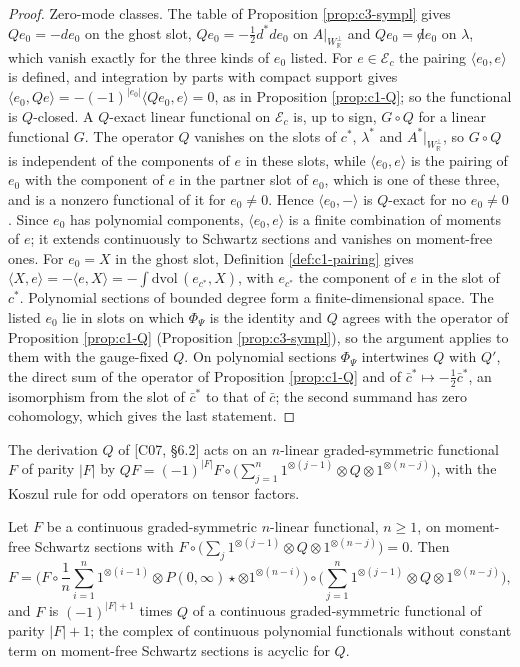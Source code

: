 \begin{proof}
Zero-mode classes. The table of Proposition \ref{prop:c3-sympl} gives $Qe_0=-de_0$ on the ghost slot, $Qe_0=-\tfrac12d^*de_0$ on $A|_{W_{\mathbb R}^\perp}$ and $Qe_0={\not d}e_0$ on $\lambda$, which vanish exactly for the three kinds of $e_0$ listed. For $e\in\mathscr E_c$ the pairing $\langle e_0,e\rangle$ is defined, and integration by parts with compact support gives $\langle e_0,Qe\rangle=-(-1)^{|e_0|}\langle Qe_0,e\rangle=0$, as in Proposition \ref{prop:c1-Q}; so the functional is $Q$-closed. A $Q$-exact linear functional on $\mathscr E_c$ is, up to sign, $G\circ Q$ for a linear functional $G$. The operator $Q$ vanishes on the slots of $c^*$, $\lambda^*$ and $A^*|_{W_{\mathbb R}^\perp}$, so $G\circ Q$ is independent of the components of $e$ in these slots, while $\langle e_0,e\rangle$ is the pairing of $e_0$ with the component of $e$ in the partner slot of $e_0$, which is one of these three, and is a nonzero functional of it for $e_0\neq0$. Hence $\langle e_0,-\rangle$ is $Q$-exact for no $e_0\neq0$. Since $e_0$ has polynomial components, $\langle e_0,e\rangle$ is a finite combination of moments of $e$; it extends continuously to Schwartz sections and vanishes on moment-free ones. For $e_0=X$ in the ghost slot, Definition \ref{def:c1-pairing} gives $\langle X,e\rangle=-\langle e,X\rangle=-\int\mathrm{dvol}\,(e_{c^*},X)$, with $e_{c^*}$ the component of $e$ in the slot of $c^*$. Polynomial sections of bounded degree form a finite-dimensional space. The listed $e_0$ lie in slots on which $\Phi_\Psi$ is the identity and $Q$ agrees with the operator of Proposition \ref{prop:c1-Q} (Proposition \ref{prop:c3-sympl}), so the argument applies to them with the gauge-fixed $Q$. On polynomial sections $\Phi_\Psi$ intertwines $Q$ with $Q'$, the direct sum of the operator of Proposition \ref{prop:c1-Q} and of $\bar c^*\mapsto-\tfrac12\bar c^*$, an isomorphism from the slot of $\bar c^*$ to that of $\bar c$; the second summand has zero cohomology, which gives the last statement.
\end{proof}

The derivation $Q$ of [C07, §6.2] acts on an $n$-linear graded-symmetric functional $F$ of parity $|F|$ by $QF=(-1)^{|F|}F\circ\big(\sum_{j=1}^n1^{\otimes(j-1)}\otimes Q\otimes1^{\otimes(n-j)}\big)$, with the Koszul rule for odd operators on tensor factors.

\begin{corollary}
\label{cor:c3-functionals}
Let $F$ be a continuous graded-symmetric $n$-linear functional, $n\ge1$, on moment-free Schwartz sections with $F\circ\big(\sum_j1^{\otimes(j-1)}\otimes Q\otimes1^{\otimes(n-j)}\big)=0$. Then
\[
F=\Big(F\circ\frac1n\sum_{i=1}^n1^{\otimes(i-1)}\otimes P(0,\infty)\star\otimes1^{\otimes(n-i)}\Big)\circ\Big(\sum_{j=1}^n1^{\otimes(j-1)}\otimes Q\otimes1^{\otimes(n-j)}\Big),
\]
and $F$ is $(-1)^{|F|+1}$ times $Q$ of a continuous graded-symmetric functional of parity $|F|+1$; the complex of continuous polynomial functionals without constant term on moment-free Schwartz sections is acyclic for $Q$.
\end{corollary}

